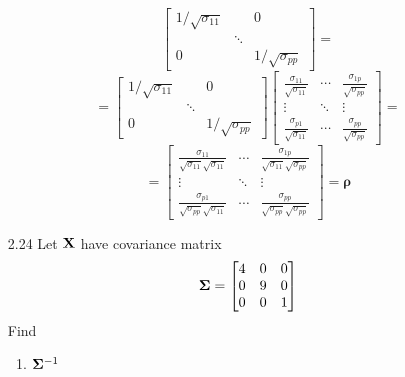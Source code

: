 \begin{enumerate}[font=\bfseries]
\[            \begin{bmatrix}
                1/\sqrt{\sigma_{11}} & & 0 \\
                & \ddots & \\
                0 & & 1/\sqrt{\sigma_{pp}}
            \end{bmatrix}
            =
        \]
        \[
            =
            \begin{bmatrix}
                1/\sqrt{\sigma_{11}} & & 0 \\
                & \ddots & \\
                0 & & 1/\sqrt{\sigma_{pp}}
            \end{bmatrix}
            \begin{bmatrix}
                \frac{\sigma_{11}}{\sqrt{\sigma_{11}}} & \cdots & \frac{\sigma_{1p}}{\sqrt{\sigma_{pp}}} \\
                \vdots & \ddots & \vdots \\
                \frac{\sigma_{p1}}{\sqrt{\sigma_{11}}} & \cdots & \frac{\sigma_{pp}}{\sqrt{\sigma_{pp}}}
            \end{bmatrix}
            =
        \]
        \[
            =
            \begin{bmatrix}
                \frac{\sigma_{11}}{\sqrt{\sigma_{11}}\sqrt{\sigma_{11}}} & \cdots & \frac{\sigma_{1p}}{\sqrt{\sigma_{11}}\sqrt{\sigma_{pp}}} \\
                \vdots & \ddots & \vdots \\
                \frac{\sigma_{p1}}{\sqrt{\sigma_{pp}}\sqrt{\sigma_{11}}} & \cdots & \frac{\sigma_{pp}}{\sqrt{\sigma_{pp}}\sqrt{\sigma_{pp}}}
            \end{bmatrix}
            = \bm{\rho}
        \]
        \item[2.24] Let $\bold{X}$ have covariance matrix
        \[
            \bold{\Sigma}
            =
            \begin{bmatrix}
                4 & 0 & 0\\
                0 & 9 & 0\\
                0 & 0 & 1
            \end{bmatrix}
        \]
        Find
        \begin{enumerate}
            \item $\bold{\Sigma}^{-1}$
            \par

\end{enumerate}
\end{enumerate}
